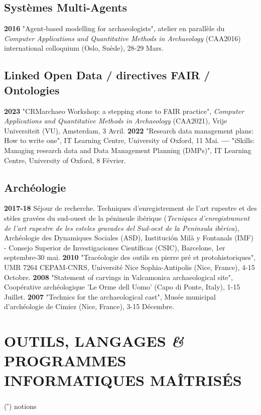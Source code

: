 \documentclass{article}
\begin{document}
\subsection*{Systèmes Multi-Agents}

\textbf{2016 }"Agent-based modelling for archaeologists", atelier en parallèle du \textit{Computer Applications and Quantitative Methods in Archaeology} (CAA2016) international colloquium (Oslo, Suède), 28-29 Mars.

\subsection*{Linked Open Data / directives FAIR / Ontologies}

\textbf{2023 }"CRMarchaeo Workshop: a stepping stone to FAIR practice", \textit{Computer Applications and Quantitative Methods in Archaeology} (CAA2021), Vrije Universiteit (VU), Amsterdam, 3 Avril.
\smallbreak
\textbf{2022 }"Research data management plans: How to write one", IT Learning Centre, University of Oxford, 11 Mai.
\smallbreak
\textbf{--- }"iSkills: Managing research data and Data Management Planning (DMPs)", IT Learning Centre, University of Oxford, 8 Février.

\subsection*{Archéologie}

\textbf{2017-18} Séjour de recherche. Techniques d'enregistrement de l'art rupestre et des stèles gravées du sud-ouest de la péninsule ibérique (\textit{Tecniques d'enregistrament de l'art rupestre de les esteles gravades del Sud-oest de la Peninsula ibèrica}), Archéologie des Dynamiques Sociales (ASD), Institución Milà y Fontanals (IMF) - Consejo Superior de Investigaciones Científicas (CSIC), Barcelone, 1er septembre-30 mai.
\smallbreak
\textbf{2010 } "Tracéologie des outils en pierre pré et protohistoriques", UMR 7264 CEPAM-CNRS, Universit\'{e} Nice Sophia-Antipolis (Nice, France), 4-15 Octobre.
\smallbreak
\textbf{2008 } "Statement of carvings in Valcamonica archaeological site", Coopérative archéologique 'Le Orme dell Uomo' (Capo di Ponte, Italy), 1-15 Juillet.
\smallbreak
\textbf{2007 } "Technics for the archaeological cast", Mus\'{e}e municipal d'arch\'{e}ologie de Cimiez (Nice, France), 3-15 Décembre.

\section*{OUTILS, LANGAGES \textit{\&} PROGRAMMES INFORMATIQUES MAÎTRISÉS}
\begin{center}(\textbf{\textsuperscript{-}}) notions\end{center}
\smallbreak
\end{document}

